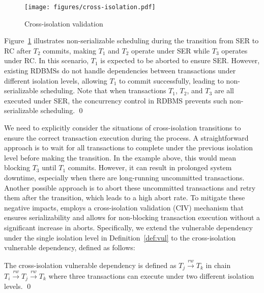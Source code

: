 \begin{figure}[t]
    \centering
    \texttt{[image: figures/cross-isolation.pdf]}
    \vspace{-4mm}
    \caption{Cross-isolation validation}
    \label{fig:cross-isolation}
    \vspace{-4mm}
\end{figure}


\begin{example}
    \label{exa:cross-isolation}
    Figure~\ref{fig:cross-isolation} illustrates non-serializable scheduling during the transition from SER to RC after $T_2$ commits, making $T_1$ and $T_2$ operate under SER while $T_3$ operates under RC. In this scenario, $T_1$ is expected to be aborted to ensure SER. However, existing RDBMSs do not handle dependencies between transactions under different isolation levels, allowing $T_1$ to commit successfully, leading to non-serializable scheduling.
    Note that when transactions $T_1$, $T_2$, and $T_3$ are all executed under SER, the concurrency control in RDBMS prevents such non-serializable scheduling. 
    \qed
\end{example}


We need to explicitly consider the situations of cross-isolation transitions to ensure the correct transaction execution during the process. 
A straightforward approach is to wait for all transactions to complete under the previous isolation level before making the transition. In the example above, this would mean blocking $T_3$ until $T_1$ commits. 
However, it can result in prolonged system downtime, especially when there are long-running uncommitted transactions. Another possible approach is to abort these uncommitted transactions and retry them after the transition, which leads to a high abort rate. 
To mitigate these negative impacts, \sysname employs a cross-isolation validation (CIV) mechanism that ensures serializability and allows for non-blocking transaction execution without a significant increase in aborts. 
Specifically, we extend the vulnerable dependency under the single isolation level in Definition~\ref{def:vul} to the cross-isolation vulnerable dependency, defined as follows:
\begin{definition}
    \label{def:transition_vul}
    The cross-isolation vulnerable dependency is defined as $T_j \xrightarrow{rw} T_k $ in chain $T_i \xrightarrow{rw} T_j \xrightarrow{rw} T_k$ where three transactions can execute under two different isolation levels.
    \qed
\end{definition}

